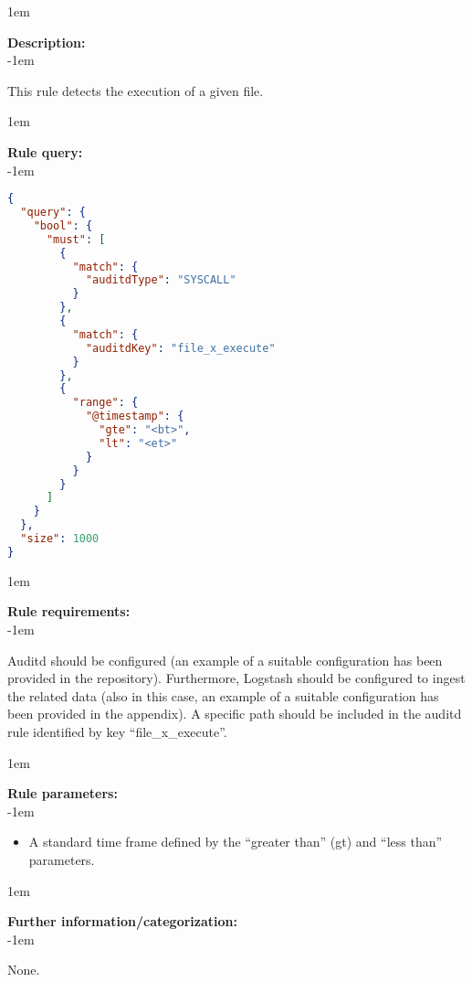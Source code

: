 \openup 1em

{\bf Description:} \\

\openup -1em
\vspace{-2em}


This rule detects the execution of a given file.

\openup 1em

{\bf Rule query:} \\

\openup -1em
\vspace{-2em}

\begin{lstlisting}[language=json,firstnumber=1]
{
  "query": {
    "bool": {
      "must": [
        {
          "match": {
            "auditdType": "SYSCALL"
          }
        },
        {
          "match": {
            "auditdKey": "file_x_execute"
          }
        },
        {
          "range": {
            "@timestamp": {
              "gte": "<bt>",
              "lt": "<et>"
            }
          }
        }
      ]
    }
  },
  "size": 1000
}
\end{lstlisting}

\openup 1em

{\bf Rule requirements:} \\

\openup -1em
\vspace{-2em}

Auditd should be configured (an example of a suitable configuration has been provided in the repository). Furthermore, Logstash should be configured to ingest the related data (also in this case, an example of a suitable configuration has been provided in the appendix). A specific path should be included in the auditd rule identified by key ``file\_x\_execute''.

\openup 1em

{\bf Rule parameters:} \\

\openup -1em
\vspace{-2em}

\begin{itemize}
	\item A standard time frame defined by the ``greater than'' (gt) and ``less than'' parameters.
\end{itemize}

\openup 1em

{\bf Further information/categorization:} \\

\openup -1em
\vspace{-2em}


None.

\pagebreak


